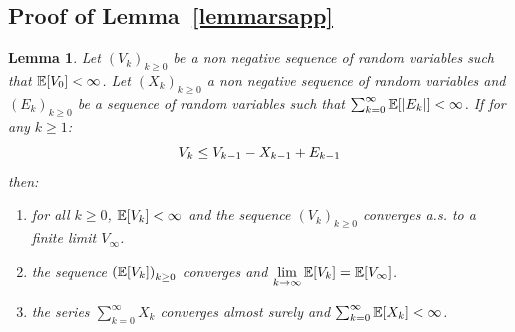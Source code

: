 \documentclass[final,12pt]{alt2022} %
\newtheorem*{Lemma*}{Lemma}
\begin{document}
\clearpage

\subsection{Proof of Lemma~\ref{lemmarsapp}}\label{appendix:lemma}
\begin{Lemma*}
Let $\left(V_k \right)_{k\geq0}$ be a non negative sequence of random variables such that $\EE[V_0] < \infty$. Let $\left(X_k \right)_{k\geq0}$ a non negative sequence of random variables and $\left(E_k \right)_{k \geq 0}$ be a sequence of random variables such that $\sum_{k=0}^{\infty}{\EE[|E_k|]} < \infty$. If for any $k \geq 1$:
\begin{equation}\notag
V_{k} \leq V_{k-1} - X_{k-1} + E_{k-1}
\end{equation}
 then:
\begin{enumerate}[label=(\roman*)]
\item for all $k \geq 0$, $\EE[V_k] < \infty$ and the sequence $\left(V_k \right)_{k\geq0}$  converges a.s. to a finite limit $V_{\infty}$.
\item the sequence $\left(\EE[V_k] \right)_{k\geq0}$ converges and $\lim \limits_{k \to \infty}\EE[V_k] = \EE[V_{\infty}] $.
\item the series $\sum_{k=0}^{\infty}{X_k}$ converges almost surely and $\sum_{k=0}^{\infty}{\EE[X_k]}< \infty$.
\end{enumerate}
\end{Lemma*}
\end{document}
